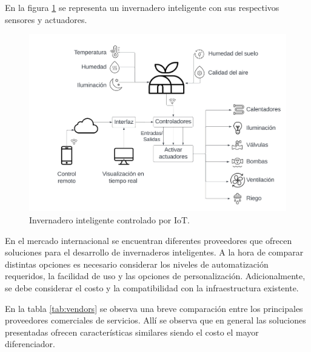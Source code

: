 En la figura \ref{fig:imgInvernaderoInteligente} se representa un invernadero inteligente con sus respectivos sensores y actuadores.

\begin{figure}[htpb]
\centering 
\includegraphics[width=.9\textwidth]{../Figures/SmartGreenhouse.jpeg}
\caption[Invernadero inteligente controlado por IoT]{Invernadero inteligente controlado por IoT\protect\footnotemark.}
\label{fig:imgInvernaderoInteligente}
\end{figure}





En el mercado internacional se encuentran diferentes proveedores que ofrecen soluciones para el desarrollo de invernaderos inteligentes. A la hora de comparar distintas opciones es necesario considerar los niveles de automatización requeridos, la facilidad de uso y las opciones de personalización. Adicionalmente, se debe considerar el costo y la compatibilidad con la infraestructura existente. 

En la tabla \ref{tab:vendors} se observa una breve comparación entre los principales proveedores comerciales de servicios. Allí se observa que en general las soluciones presentadas ofrecen características similares siendo el costo el mayor diferenciador.




